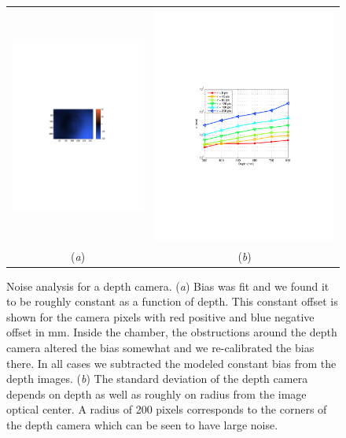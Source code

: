 \begin{figure}
\begin{tabular}{ c c }
  \includegraphics[width=5.5cm,trim=160 260 170 260,clip]{Figures/BiasError} &
  \includegraphics[width=7.5cm,trim=110 240 50 240,clip]{Figures/SigmaRadius} \\
  (\emph{a}) & (\emph{b}) \\
\end{tabular}
\caption{Noise analysis for a depth camera.  (\emph{a}) Bias was fit and we found it to be roughly constant as a function of depth.  This constant offset is shown for the camera pixels with red positive and blue negative offset in mm.  Inside the chamber, the obstructions around the depth camera altered the bias somewhat and we re-calibrated the bias there.  In all cases we subtracted the modeled constant bias from the depth images.  (\emph{b}) The standard deviation of the depth camera depends on depth as well as roughly on radius from the image optical center.  A radius of 200 pixels corresponds to the corners of the depth camera which can be seen to have large noise. }
\label{fig:Bias}
\end{figure}


